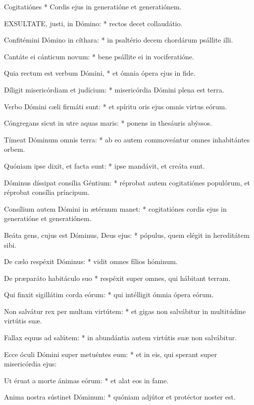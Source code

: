 
 Cogitatiónes * Cordis ejus in generatióne et generatiónem.


\lettrine[lines=2]{E}{XSULTATE}, justi, in Dómino: * rectos decet collaudátio.

Confitémini Dómino in cíthara: * in psaltério decem chordárum psállite illi.

Cantáte ei cánticum novum: * bene psállite ei in vociferatióne.

Quia rectum est verbum Dómini, * et ómnia ópera ejus in fide.

Díligit misericórdiam et judícium: * misericórdia Dómini plena est terra.

Verbo Dómini cæli firmáti sunt: * et spíritu oris ejus omnis virtus eórum.

Cóngregans sicut in utre aquas maris: * ponens in thesáuris abýssos.

Tímeat Dóminum omnis terra: * ab eo autem commoveántur omnes inhabitántes orbem.

Quóniam ipse dixit, et facta sunt: * ipse mandávit, et creáta sunt.

Dóminus díssipat consília Géntium: * réprobat autem cogitatiónes populórum, et réprobat consília príncipum.

Consílium autem Dómini in ætérnum manet: * cogitatiónes cordis ejus in generatióne et generatiónem.

Beáta gens, cujus est Dóminus, Deus ejus: * pópulus, quem elégit in hereditátem sibi.

De cælo respéxit Dóminus: * vidit omnes fílios hóminum.

De præparáto habitáculo suo * respéxit super omnes, qui hábitant terram.

Qui finxit sigillátim corda eórum: * qui intélligit ómnia ópera eórum.

Non salvátur rex per multam virtútem: * et gigas non salvábitur in multitúdine virtútis suæ.

Fallax equus ad salútem: * in abundántia autem virtútis suæ non salvábitur.

Ecce óculi Dómini super metuéntes eum: * et in eis, qui sperant super misericórdia ejus:

Ut éruat a morte ánimas eórum: * et alat eos in fame.

Anima nostra sústinet Dóminum: * quóniam adjútor et protéctor noster est.

